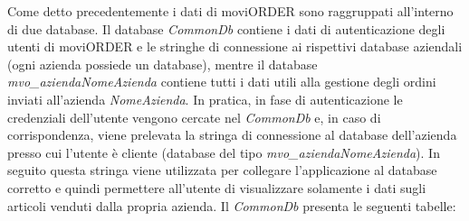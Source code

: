 Come detto precedentemente i dati di moviORDER sono raggruppati all'interno di due database. Il database \textit{CommonDb} contiene i dati di autenticazione degli utenti di moviORDER e le stringhe di connessione ai rispettivi database aziendali (ogni azienda possiede un database), mentre il database \textit{mvo\_aziendaNomeAzienda} contiene tutti i dati utili alla gestione degli ordini inviati all'azienda \textit{NomeAzienda}. In pratica, in fase di autenticazione le credenziali dell'utente vengono cercate nel \textit{CommonDb} e, in caso di corrispondenza, viene prelevata la stringa di connessione al database dell'azienda presso cui l'utente è cliente (database del tipo \textit{mvo_aziendaNomeAzienda}). In seguito questa stringa viene utilizzata per collegare l'applicazione al database corretto e quindi permettere all'utente di visualizzare solamente i dati sugli articoli venduti dalla propria azienda.
Il \textit{CommonDb} presenta le seguenti tabelle:

